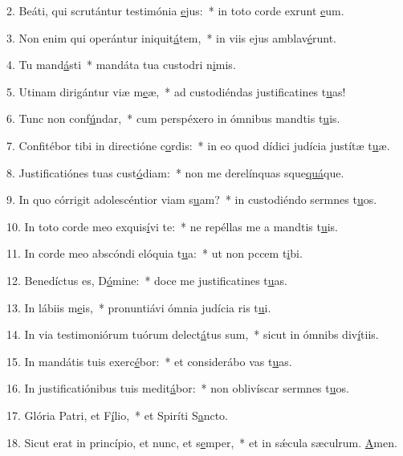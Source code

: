 2. Beáti, qui scrutántur testimónia \uline{e}jus:~* in toto corde exrunt \uline{e}um.\par 
3. Non enim qui operántur iniquit\uline{á}tem,~* in viis ejus amblav\uline{é}runt.\par 
4. Tu mand\uline{á}sti~* mandáta tua custodri n\uline{i}mis.\par 
5. Utinam dirigántur viæ m\uline{e}æ,~* ad custodiéndas justificatines t\uline{u}as!\par 
6. Tunc non conf\uline{ú}ndar,~* cum perspéxero in ómnibus mandtis t\uline{u}is.\par 
7. Confitébor tibi in directióne c\uline{o}rdis:~* in eo quod dídici judícia justítæ t\uline{u}æ.\par 
8. Justificatiónes tuas cust\uline{ó}diam:~* non me derelínquas sque\uline{quá}que.\par 
9. In quo córrigit adolescéntior viam s\uline{u}am?~* in custodiéndo sermnes t\uline{u}os.\par 
10. In toto corde meo exquis\uline{í}vi te:~* ne repéllas me a mandtis t\uline{u}is.\par 
11. In corde meo abscóndi elóquia t\uline{u}a:~* ut non pccem t\uline{i}bi.\par 
12. Benedíctus es, D\uline{ó}mine:~* doce me justificatines t\uline{u}as.\par 
13. In lábiis m\uline{e}is,~* pronuntiávi ómnia judícia ris t\uline{u}i.\par 
14. In via testimoniórum tuórum delect\uline{á}tus sum,~* sicut in ómnibs div\uline{í}tiis.\par 
15. In mandátis tuis exerc\uline{é}bor:~* et considerábo vas t\uline{u}as.\par 
16. In justificatiónibus tuis medit\uline{á}bor:~* non oblivíscar sermnes t\uline{u}os.\par 
17. Glória Patri, et F\uline{í}lio,~* et Spiríti S\uline{a}ncto.\par 
18. Sicut erat in princípio, et nunc, et s\uline{e}mper,~* et in sǽcula sæculrum. \uline{A}men.\par 
